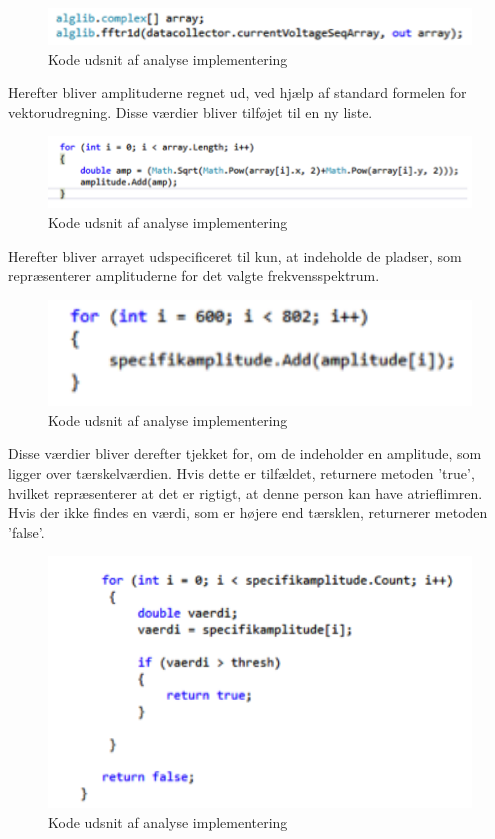 \begin{figure}[H]
	\centering
	\includegraphics[width=1\textwidth]{Figurer/Snip20150525_41}
	\caption{Kode udsnit af analyse implementering}
\end{figure}

Herefter bliver amplituderne regnet ud, ved hjælp af standard formelen for vektorudregning. Disse værdier bliver tilføjet til en ny liste. 

\begin{figure}[H]
	\centering
	\includegraphics[width=1\textwidth]{Figurer/Snip20150525_43}
	\caption{Kode udsnit af analyse implementering}
\end{figure}

Herefter bliver arrayet udspecificeret til kun, at indeholde de pladser, som repræsenterer amplituderne for det valgte frekvensspektrum. 

\begin{figure}[H]
	\centering
	\includegraphics[width=1\textwidth]{Figurer/Snip20150525_44}
	\caption{Kode udsnit af analyse implementering}
\end{figure}

Disse værdier bliver derefter tjekket for, om de indeholder en amplitude, som ligger over tærskelværdien. Hvis dette er tilfældet, returnere metoden ’true’, hvilket repræsenterer at det er rigtigt, at denne person kan have atrieflimren. Hvis der ikke findes en værdi, som er højere end tærsklen, returnerer metoden ’false’. 

\begin{figure}[H]
	\centering
	\includegraphics[width=1\textwidth]{Figurer/Snip20150525_47}
	\caption{Kode udsnit af analyse implementering}
\end{figure}

